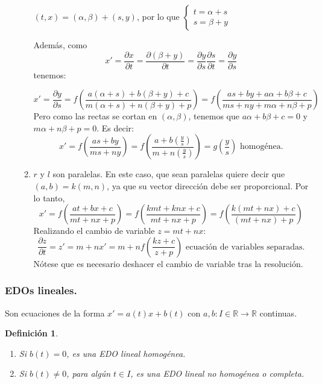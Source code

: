 \documentclass{article}
\theoremstyle{theorem-style}  %
\theoremstyle{definition-style}
\newtheorem{definition}{Definición}[section]
\theoremstyle{example-style}
\begin{document}
\begin{enumerate}[\quad i)]
\begin{enumerate}
		$ (t,x) = (\alpha,\beta)+(s,y) $, por lo que $ \begin{cases}
		t=\alpha+s\\
		s=\beta+y
		\end{cases} $
		
		Además, como \[  x'=\frac{\partial x}{\partial t}=\frac{\partial (\beta+y)}{\partial t}=\frac{\partial y}{\partial s}\frac{\partial s}{\partial t}=\frac{\partial y}{\partial s}   \]tenemos:
		
		\[  x'=\frac{\partial y}{\partial s}= f(\frac{a(\alpha+s)+b(\beta+y)+c}{m(\alpha+s)+n(\beta+y)+p})= f(\frac{as+by+a\alpha+b\beta+c}{ms+ny+m\alpha+n\beta+p})  \]
		Pero como las rectas se cortan en $ (\alpha, \beta) $, tenemos que $ a\alpha+b\beta+c=0 $ y $ m\alpha+n\beta+p=0 $. Es decir:
		\[ x'=f(\frac{as+by}{ms+ny})=f(\frac{a+b(\frac{y}{s})}{m+n(\frac{y}{s})})=g(\frac{y}{s}) \text{ homogénea.}\]
		\item $ r $ y $ l $ son paralelas. En este caso, que sean paralelas quiere decir que $ (a,b)=k(m,n) $, ya que su vector dirección debe ser proporcional. Por lo tanto,
		\[ x'=f(\frac{at+bx+c}{mt+nx+p})=f(\frac{kmt+knx+c}{mt+nx+p})=f(\frac{k(mt+nx)+c}{(mt+nx)+p})\]
		Realizando el cambio de variable $ z=mt+nx $:
		\[ \frac{\partial z}{\partial t}=z'=m+nx'=m+nf(\frac{kz+c}{z+p}) \text{ ecuación de variables separadas.} \]
		Nótese que es necesario deshacer el cambio de variable tras la resolución.
	\end{enumerate}
\end{enumerate}
\subsubsection{EDOs lineales.}
Son ecuaciones de la forma $ x'=a(t)x+b(t) $ con $ a,b: I\in\mathbb{R}\longrightarrow \mathbb{R} $ continuas.
\begin{definition}\ 
	\begin{enumerate}[\quad i)]
		\item Si $ b(t)=0 $, es una \emph{EDO lineal homogénea}.
		\item Si $ b(t)\neq 0 $, para algún $ t\in I $, es una \emph{EDO lineal no homogénea o completa}.
	\end{enumerate}
\end{definition}
\end{document}
